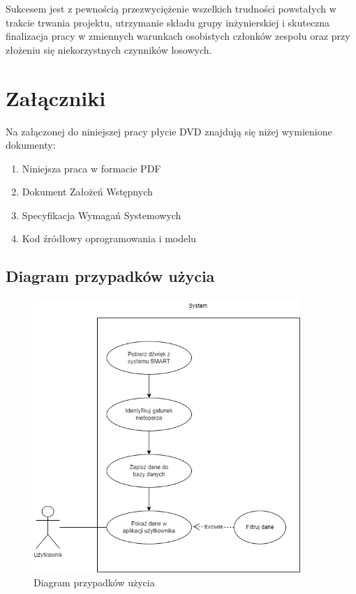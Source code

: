 \documentclass{sprz}
\begin{document}
Sukcesem jest z pewnością przezwyciężenie wszelkich trudności powstałych w trakcie trwania projektu, utrzymanie składu grupy inżynierskiej i skuteczna finalizacja pracy w zmiennych warunkach osobistych członków zespołu oraz przy złożeniu się niekorzystnych czynników losowych.

\chapter{Załączniki}

Na załączonej do niniejszej pracy płycie DVD znajdują się niżej wymienione dokumenty:
\begin{enumerate}
  \item Niniejsza praca w formacie PDF
  \item Dokument Założeń Wstępnych
  \item Specyfikacja Wymagań Systemowych
  \item Kod źródłowy oprogramowania i modelu
\end{enumerate}

\clearpage

\section{Diagram przypadków użycia}
\begin{figure}[h]
  \centering
  \includegraphics[width=0.9\textwidth]{sprz/use-case}
  \caption{Diagram przypadków użycia}
  \label{img:use-case}
\end{figure}

\printbibliography[title={Bibliografia}, heading=bibintoc]
\end{document}
